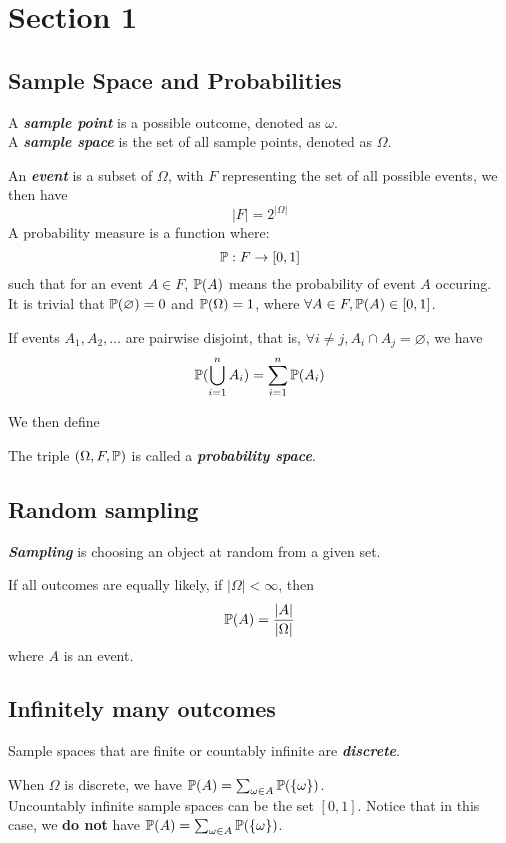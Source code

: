 \section{Section 1}
\subsection{Sample Space and Probabilities}
\begin{definition}
    A \textbf{\textit{sample point}} is a possible outcome, denoted as $\omega$. \\
    A \textbf{\textit{sample space}} is the set of all sample points, denoted as $\Omega$.
\end{definition}
An \textbf{\textit{event}} is a subset of $\Omega$, with $F$ representing the set of all possible events, we then have
$$|F| = 2^{|\Omega|}$$
A probability measure is a function where:
$$\mathbb{P}: F \to [0, 1]$$
such that for an event $A \in F$, $\mathbb{P}(A)$ means the probability of event $A$ occuring. \\
It is trivial that $\mathbb{P}(\varnothing) = 0$ and $\mathbb{P}(\Omega) = 1$, where $\forall A \in F, \mathbb{P}(A) \in [0, 1]$.
\begin{theorem}
    If events $A_1, A_2, \dots$ are pairwise disjoint, that is, $\forall i \ne j, A_i \cap A_j = \varnothing$, we have
    $$\mathbb{P}(\bigcup_{i = 1}^{n} A_i) = \sum_{i = 1}^{n} \mathbb{P}(A_i)$$
\end{theorem}
We then define
\begin{definition}
    The triple $(\Omega, F, \mathbb{P})$ is called a \textbf{\textit{probability space}}.
\end{definition}

\subsection{Random sampling}
\textbf{\textit{Sampling}} is choosing an object at random from a given set.
\begin{theorem}
    If all outcomes are equally likely, if $|\Omega| < \infty$, then
    $$\mathbb{P}(A) = \frac{|A|}{|\Omega|}$$
    where $A$ is an event.
\end{theorem}

\subsection{Infinitely many outcomes}
\begin{definition}
    Sample spaces that are finite or countably infinite are \textbf{\textit{discrete}}.
\end{definition}
When $\Omega$ is discrete, we have $\mathbb{P}(A) = \sum_{\omega \in A} \mathbb{P}(\{\omega\})$. \\
Uncountably infinite sample spaces can be the set $[0, 1]$. Notice that in this case, we \textbf{do not} have $\mathbb{P}(A) = \sum_{\omega \in A} \mathbb{P}(\{\omega\})$.

